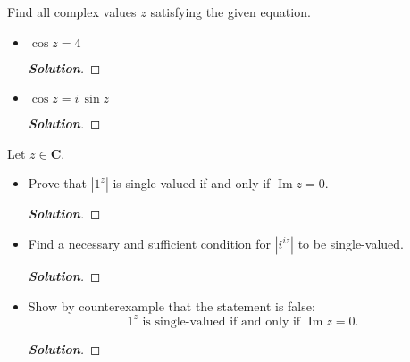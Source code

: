 \documentclass[11pt]{article}
\newenvironment{problem}[2][Problem\!]{\begin{trivlist}
\item[\hskip \labelsep {\bfseries #1}\hskip \labelsep {\bfseries #2.}]}{\end{trivlist}}
\newenvironment{solution}{\begin{proof}[\textbf{\textit{Solution}}]}{\end{proof}}
\newcommand{\cc}{\mathbf C}   %
\newcommand{\abs}[1]{\left\lvert#1\right\rvert} %
\renewcommand{\Im}{\operatorname{Im}}
\begin{document}
\newpage  %

\begin{problem}{5.5}
Find all complex values $z$ satisfying the given equation.
\begin{itemize}[itemsep=3em]
\item[(a)] $\cos z = 4$
\begin{solution}
\end{solution}

\item[(b)] $\cos z = i\,\sin z$
\begin{solution}
\end{solution}

\end{itemize}
\end{problem}

\newpage %

\begin{problem}{5.6}
Let $z \in \cc$.
\begin{itemize}[itemsep=3em]
\item[(a)] Prove that $\abs{1^z}$ is single-valued if and only if $\Im z = 0$.
\begin{solution}
\end{solution}

\item[(b)] Find a necessary and sufficient condition for $\abs{i^{iz}}$ to be single-valued.
\begin{solution}
\end{solution}

\item[(c)] Show by counterexample that the statement is false: \[\text{$1^z$ is single-valued if and only if $\Im z = 0$.}\]
\begin{solution}
\end{solution}

\end{itemize}
\end{problem}
\end{document}

